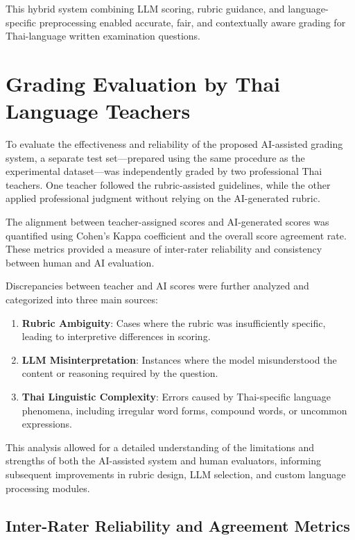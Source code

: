 This hybrid system combining LLM scoring, rubric guidance, and 
language-specific preprocessing enabled accurate, fair, and 
contextually aware grading for Thai-language written examination 
questions.


\section{Grading Evaluation by Thai Language Teachers}

To evaluate the effectiveness and reliability of the proposed 
AI-assisted grading system, a separate test set—prepared using 
the same procedure as the experimental dataset—was independently 
graded by two professional Thai teachers. One teacher followed 
the rubric-assisted guidelines, while the other applied 
professional judgment without relying on the AI-generated rubric. 

The alignment between teacher-assigned scores and AI-generated 
scores was quantified using Cohen’s Kappa coefficient and the 
overall score agreement rate. These metrics provided a measure 
of inter-rater reliability and consistency between human and 
AI evaluation. 

Discrepancies between teacher and AI scores were further 
analyzed and categorized into three main sources:

\begin{enumerate}
    \item \textbf{Rubric Ambiguity}: Cases where the rubric was insufficiently specific, leading to interpretive differences in scoring.
    \item \textbf{LLM Misinterpretation}: Instances where the model misunderstood the content or reasoning required by the question.
    \item \textbf{Thai Linguistic Complexity}: Errors caused by Thai-specific language phenomena, including irregular word forms, compound words, or uncommon expressions.
\end{enumerate}

This analysis allowed for a detailed understanding of the 
limitations and strengths of both the AI-assisted system and 
human evaluators, informing subsequent improvements in rubric 
design, LLM selection, and custom language processing modules.

\subsection{Inter-Rater Reliability and Agreement Metrics}

